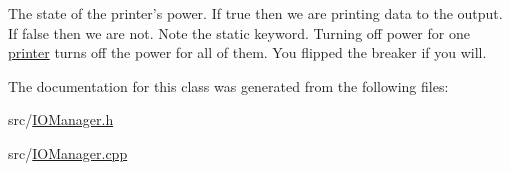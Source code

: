 The state of the printer's power. If true then we are printing data to the output. If false then we are not. Note the static keyword. Turning off power for one \hyperlink{classJKBuilder_1_1printer}{printer} turns off the power for all of them. You flipped the breaker if you will. 

The documentation for this class was generated from the following files:\begin{DoxyCompactItemize}
\item 
src/\hyperlink{IOManager_8h}{IOManager.h}\item 
src/\hyperlink{IOManager_8cpp}{IOManager.cpp}\end{DoxyCompactItemize}
